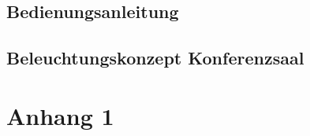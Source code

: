\documentclass[
    headings=optiontotocandhead,%
    twoside,
    numbers=noenddot,%
    toc=flat, %
    12pt, %
    titlepage, %
    parskip=full, %
    listof=totoc, %
    listof=flat, %
    numbers=noenddot, %
    bibliography=totoc, %
    a4paper,DIV=14,
    BCOR=15mm,
]{scrbook}
\begin{document}
\section{Bedienungsanleitung}\label{Bedienungsanleitung}

\renewcommand{\kapitelautor}{Autor: Clemens Scharwitzl}

% 

\section{Beleuchtungskonzept Konferenzsaal}\label{Beleuchtungskonzept-Konferenzsaal}

\renewcommand{\kapitelautor}{Autor: Clemens Scharwitzl}

% 






% 




% 

% 

% 


\appendix

\chapter{Anhang 1\label{chap:Anhang-1}}
\end{document}
